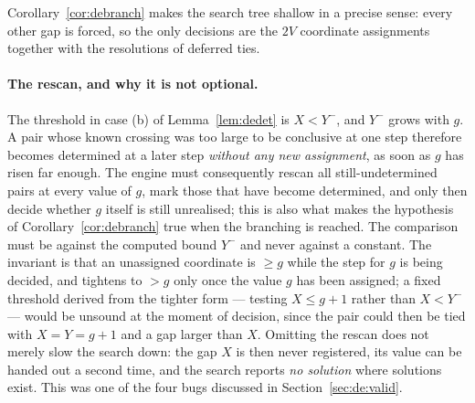 Corollary~\ref{cor:debranch} makes the search tree shallow in a precise sense:
every other gap is forced, so the only decisions are the $2V$ coordinate
assignments together with the resolutions of deferred ties.

\paragraph{The rescan, and why it is not optional.}
The threshold in case (b) of Lemma~\ref{lem:dedet} is $X<Y^-$, and $Y^-$ grows
with $g$.  A pair whose known crossing was too large to be conclusive at one
step therefore becomes determined at a later step \emph{without any new
assignment}, as soon as $g$ has risen far enough.  The engine must consequently
rescan all still-undetermined pairs at every value of $g$, mark those that have
become determined, and only then decide whether $g$ itself is still unrealised;
this is also what makes the hypothesis of Corollary~\ref{cor:debranch} true when
the branching is reached.  The comparison must be against the computed bound
$Y^-$ and never against a constant.  The invariant is that an unassigned
coordinate is $\ge g$ while the step for $g$ is being decided, and tightens to
$>g$ only once the value $g$ has been assigned; a fixed threshold derived from
the tighter form --- testing $X\le g+1$ rather than $X<Y^-$ --- would be unsound
at the moment of decision, since the pair could then be tied with $X=Y=g+1$ and
a gap larger than $X$.  Omitting the rescan does not merely slow the search
down: the gap $X$ is then never registered, its value can be handed out a second
time, and the search reports \emph{no solution} where solutions exist.  This was
one of the four bugs discussed in Section~\ref{sec:de:valid}.

